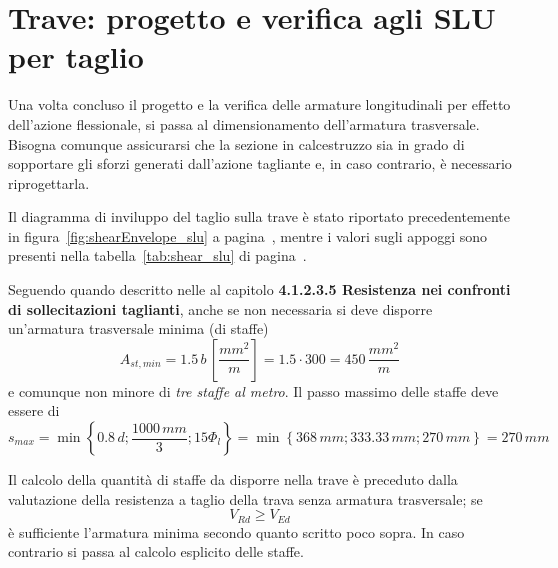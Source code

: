 \chapter{Trave: progetto e verifica agli SLU per taglio}\label{chap:traveTaglio}
Una volta concluso il progetto e la verifica delle armature longitudinali per effetto dell'azione flessionale, si passa al dimensionamento dell'armatura trasversale. Bisogna comunque assicurarsi che la sezione in calcestruzzo sia in grado di sopportare gli sforzi generati dall'azione tagliante e, in caso contrario, è necessario riprogettarla. 

Il diagramma di inviluppo del taglio sulla trave è stato riportato precedentemente in figura~\ref{fig:shearEnvelope_slu} a pagina~\pageref{fig:shearEnvelope_slu}, mentre i valori sugli appoggi sono presenti nella tabella~\ref{tab:shear_slu} di pagina~\pageref{tab:shear_slu}.

Seguendo quando descritto nelle \ntc al capitolo \textbf{4.1.2.3.5 Resistenza nei confronti di sollecitazioni taglianti}, anche se non necessaria si deve disporre un'armatura trasversale minima (di staffe)
\[
A_{st,min} = 1.5\,b\,\left[\dfrac{mm^2}{m}\right] = 1.5\cdot 300 = 450\,\dfrac{mm^2}{m}
\]
e comunque non minore di \emph{tre staffe al metro}. Il passo massimo delle staffe deve essere di
\[
s_{max} = \min\left\{0.8\,d; \dfrac{1000\,mm}{3}; 15\Phi_l\right\} =\min\left\{368\,mm; 333.33\,mm; 270\,mm\right\} = 270\,mm
\]

Il calcolo della quantità di staffe da disporre nella trave è preceduto dalla valutazione della resistenza a taglio della trava senza armatura trasversale; se
\[
V_{Rd} \geq V_{Ed}
\]
è sufficiente l'armatura minima secondo quanto scritto poco sopra. In caso contrario si passa al calcolo esplicito delle staffe.

